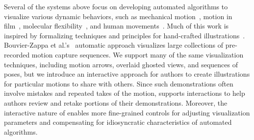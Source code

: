 Several of the systems above focus on developing automated algorithms to visualize various dynamic behaviors, such as mechanical motion~\cite{li2008automated,mitra2010illustrating,Seligmann:1991:AGI:127719.122732}, motion in film~\cite{goldman2006schematic}, molecular flexibility~\cite{Bryden-TVCG2012}, and human movements~\cite{assa2005action,bouvier2007motion,choi2012retrieval}.
%
Much of this work is inspired by formalizing techniques and principles for hand-crafted illustrations~\cite{Agrawala:2011:DPV:1924421.1924439}.
%
Bouvier-Zappa et al.'s~\cite{bouvier2007motion} automatic approach visualizes large collections of pre-recorded motion capture sequences.
We support many of the same visualization techniques, including motion arrows, overlaid ghosted views, and sequences of poses, but we introduce an interactive approach for authors to create illustrations for particular motions to share with others.
%
Since such demonstrations often involve mistakes and repeated takes of the motion, \systemname{} supports interactions to help authors review and retake portions of their demonstrations.
Moreover, the interactive nature of \systemname{} enables more fine-grained controls for adjusting visualization parameters and compensating for idiosyncratic characteristics of automated algorithms.
